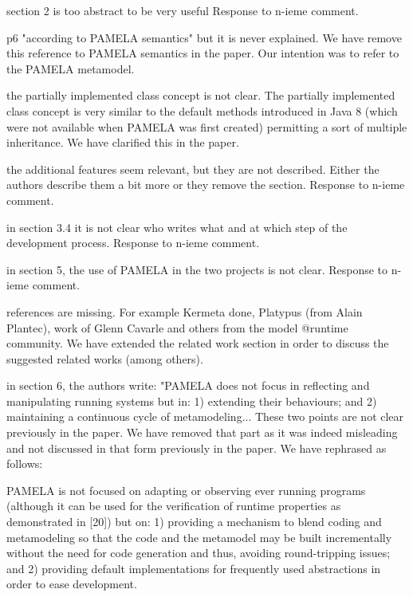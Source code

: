 \documentclass[10pt]{article}
\begin{document}
\begin{response}{section 2 is too abstract to be very useful}
  Response to n-ieme comment.
\end{response}

\begin{response}{p6 "according to PAMELA semantics" but it is never explained.}
We have remove this reference to PAMELA semantics in the paper. Our intention was to refer to the PAMELA metamodel.
\end{response}

\begin{response}{the partially implemented class concept is not clear.}
The partially implemented class concept is very similar to the default methods introduced in Java 8 (which were not available when PAMELA was first created) permitting a sort of multiple inheritance. We have clarified this in the paper.
\end{response}

\begin{response}{the additional features seem relevant, but they are not described. Either the authors describe them a bit more or they remove the section.}
  Response to n-ieme comment.
\end{response}


\begin{response}{in section 3.4 it is not clear who writes what and at which step of the development process.}
  Response to n-ieme comment.
\end{response}

\begin{response}{in section 5, the use of PAMELA in the two projects is not clear.}
  Response to n-ieme comment.
\end{response}

\begin{response}{references are missing. For example Kermeta done, Platypus (from Alain Plantec), work of Glenn Cavarle and others from the model @runtime community.}
We have extended the related work section in order to discuss the suggested related works (among others).
\end{response}


\begin{response}{in section 6, the authors write: "PAMELA does not focus in reflecting and manipulating running systems but in: 1) extending their behaviours; and 2) maintaining a continuous cycle of metamodeling... These two points are not clear previously in the paper.
}
We have removed that part as it was indeed misleading and not discussed in that form previously in the paper. We have rephrased as follows:

PAMELA is not focused on adapting or observing ever running programs (although it can be used for the verification of runtime properties as demonstrated in [20]) but on:  1) providing a mechanism to blend coding and metamodeling so that the code and the metamodel  may  be  built  incrementally  without  the  need  for  code  generation and thus,  avoiding round-tripping issues;  and 2) providing default implementations for frequently used abstractions in order to ease development.
\end{response}
\end{document}
